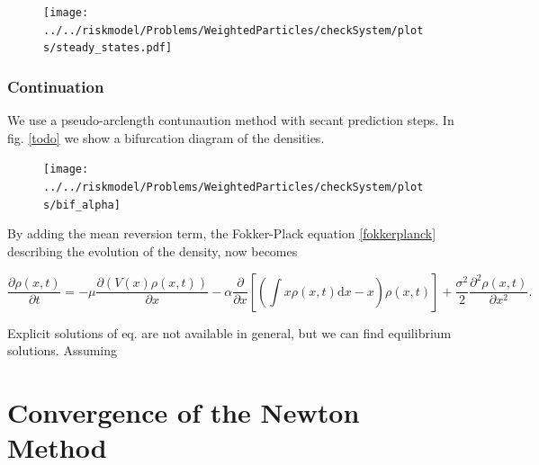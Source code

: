 \documentclass[]{article}
\newcommand{\pa}[2]{\frac{\partial #1}{\partial #2}}
\newcommand{\ppa}[2]{\frac{\partial^2 #1}{\partial #2^2}}
\theoremstyle{definition}
\begin{document}
\begin{center}
\begin{figure}
\texttt{[image: ../../riskmodel/Problems/WeightedParticles/checkSystem/plots/steady\_states.pdf]}
\caption{\label{fig:bif_anal}}
\end{figure}
\end{center}



\subsubsection{Continuation}
We use a pseudo-arclength contunaution method with secant prediction steps.
In fig. \ref{todo} we show a bifurcation diagram of the densities. 





\begin{center}
\begin{figure}
\texttt{[image: ../../riskmodel/Problems/WeightedParticles/checkSystem/plots/bif\_alpha]}
\caption{\label{fig:bif_anal}}
\end{figure}
\end{center}




%
%


By adding the mean reversion term, the Fokker-Plack equation \eqref{fokkerplanck}  describing the evolution of the density, now becomes

\begin{equation}
\label{fp_mean_field}
\pa{\rho(x,t)}{t} = - \mu \pa{( V(x) \rho(x,t))}{x} - \alpha \pa{}{x} \left[ \left(\int x \rho(x,t) \mathrm{d}x  -x \right) \rho(x,t) \right] + \frac{\sigma^2}{2}  \ppa{\rho(x,t)}{x} .
\end{equation}

Explicit solutions of eq. \label{fp_mean_field} are not available in general, but we can find equilibrium solutions. Assuming 





\section{Convergence of the Newton Method}





\end{document}
